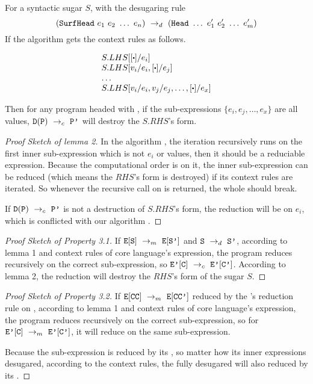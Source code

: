 \begin{lemma}
For a syntactic sugar $S$, with the desugaring rule
\[
(\mbox{\tt SurfHead}~e_1~e_2~\ldots~e_n) ~\rightarrow_d~ (\mbox{\tt Head}~\ldots~e_1'~e_2'~\ldots~e_m')
\]
If the algorithm  gets the context rules as follows.
\begin{center}
	\[
		\begin{array}{l}
			S.LHS[[\bigcdot]/e_i]\\
			S.LHS[v_i/e_i, [\bigcdot]/e_j]\\
			\ldots\\
			S.LHS[v_i/e_i, v_j/e_j, \ldots, [\bigcdot]/e_x]\\
		\end{array}
	\]


\end{center}

Then for any program  headed with , if the sub-expressions $\{e_i, e_j, \ldots, e_x\}$ are all values, $\mathtt{D}(\mbox{\tt P}) ~\rightarrow_c~\mbox{\tt P'}$ will destroy the $S.RHS$'s form.
\end{lemma}
\begin{proof}[Proof Sketch of lemma 2]
In the algorithm , the iteration recursively runs on the first inner sub-expression which is not $e_i$ or values, then it should be a reduciable expression. Because the computational order is on it, the inner sub-expression can be reduced (which means the $RHS$'s form is destroyed) if its context rules are iterated. So whenever the recursive call on  is returned, the whole  should break.

If $\mathtt{D}(\mbox{\tt P}) ~\rightarrow_c~\mbox{\tt P'}$ is not a destruction of $S.RHS$'s form, the reduction will be on $e_i$, which is conflicted with our algorithm .
\end{proof}


\begin{proof} [Proof Sketch of Property 3.1]
If $\mbox{\tt E}[\mbox{\tt S}] ~\rightarrow_m~\mbox{\tt E}[\mbox{\tt S'}]$ and $\mbox{\tt S} ~\rightarrow_d~ \mbox{\tt S'}$, according to lemma 1 and context rules of core language's expression, the program  reduces recursively on the correct sub-expression, so $\mbox{\tt E'}[\mbox{\tt C}] ~\rightarrow_c~\mbox{\tt E'}[\mbox{\tt C'}]$.
According to lemma 2, the reduction will destroy the $RHS$'s form of the sugar $S$.

\end{proof}

\begin{proof} [Proof Sketch of Property 3.2]
If $\mbox{\tt E}[\mbox{\tt CC}] ~\rightarrow_m~\mbox{\tt E}[\mbox{\tt CC'}]$ reduced by the 's reduction rule on , according to lemma 1 and context rules of core language's expression, the program  reduces recursively on the correct sub-expression, so for $\mbox{\tt E'}[\mbox{\tt C}] ~\rightarrow_m~\mbox{\tt E'}[\mbox{\tt C'}]$, it will reduce on the same sub-expression.

Because the sub-expression  is reduced by its , so matter how its inner expressions desugared, according to the context rules, the fully desugared  will also reduced by its .

\end{proof}

